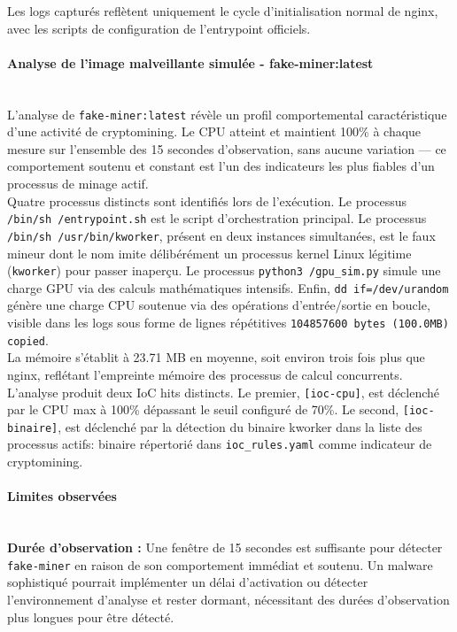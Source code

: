 \noindent Les logs capturés reflètent uniquement le cycle d'initialisation normal de nginx, avec les scripts de configuration de l'entrypoint officiels.
\noindent \paragraph{Analyse de l'image malveillante simulée  - fake-miner:latest} \mbox{} \\
\noindent L'analyse de \texttt{fake-miner:latest} révèle un profil comportemental caractéristique d'une activité de cryptomining. Le CPU atteint et maintient 100\% à chaque mesure sur l'ensemble des 15 secondes d'observation, sans aucune variation — ce comportement soutenu et constant est l'un des indicateurs les plus fiables d'un processus de minage actif. \\

\noindent Quatre processus distincts sont identifiés lors de l'exécution. Le processus \texttt{/bin/sh /entrypoint.sh} est le script d'orchestration principal. Le processus \texttt{/bin/sh /usr/bin/kworker}, présent en deux instances simultanées, est le faux mineur dont le nom imite délibérément un processus kernel Linux légitime (\texttt{kworker}) pour passer inaperçu. Le processus \texttt{python3 /gpu\_sim.py} simule une charge GPU via des calculs mathématiques intensifs. Enfin, \texttt{dd if=/dev/urandom} génère une charge CPU soutenue via des opérations d'entrée/sortie en boucle, visible dans les logs sous forme de lignes répétitives \texttt{104857600 bytes (100.0MB) copied}. \\

\noindent La mémoire s'établit à 23.71 MB en moyenne, soit environ trois fois plus que nginx, reflétant l'empreinte mémoire des processus de calcul concurrents. \\

\noindent L'analyse produit deux IoC hits distincts. Le premier, \texttt{[ioc-cpu]}, est déclenché par le CPU max à 100\% dépassant le seuil configuré de 70\%. Le second, \texttt{[ioc-binaire]}, est déclenché par la détection du binaire kworker dans la liste des processus actifs: binaire répertorié dans \texttt{ioc\_rules.yaml} comme indicateur de cryptomining. \\
\noindent \paragraph{Limites observées} \mbox{} \\
\noindent \textbf{Durée d'observation :} Une fenêtre de 15 secondes est suffisante pour détecter \texttt{fake-miner} en raison de son comportement immédiat et soutenu. Un malware sophistiqué pourrait implémenter un délai d'activation ou détecter l'environnement d'analyse et rester dormant, nécessitant des durées d'observation plus longues pour être détecté. \\

